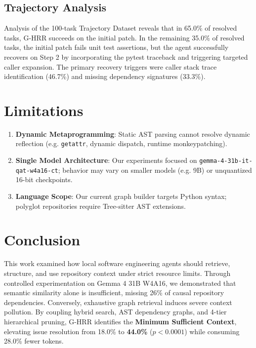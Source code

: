 \documentclass[10pt,twocolumn,letterpaper]{article}
\begin{document}
\subsection{Trajectory Analysis}
Analysis of the 100-task Trajectory Dataset reveals that in 65.0\% of resolved tasks, G-HRR succeeds on the initial patch. In the remaining 35.0\% of resolved tasks, the initial patch fails unit test assertions, but the agent successfully recovers on Step 2 by incorporating the pytest traceback and triggering targeted caller expansion. The primary recovery triggers were caller stack trace identification (46.7\%) and missing dependency signatures (33.3\%).

\section{Limitations}
\begin{enumerate}
    \item \textbf{Dynamic Metaprogramming}: Static AST parsing cannot resolve dynamic reflection (e.g. \texttt{getattr}, dynamic dispatch, runtime monkeypatching).
    \item \textbf{Single Model Architecture}: Our experiments focused on \texttt{gemma-4-31b-it-qat-w4a16-ct}; behavior may vary on smaller models (e.g. 9B) or unquantized 16-bit checkpoints.
    \item \textbf{Language Scope}: Our current graph builder targets Python syntax; polyglot repositories require Tree-sitter AST extensions.
\end{enumerate}

\section{Conclusion}
This work examined how local software engineering agents should retrieve, structure, and use repository context under strict resource limits. Through controlled experimentation on Gemma 4 31B W4A16, we demonstrated that semantic similarity alone is insufficient, missing 26\% of causal repository dependencies. Conversely, exhaustive graph retrieval induces severe context pollution. By coupling hybrid search, AST dependency graphs, and 4-tier hierarchical pruning, G-HRR identifies the \textbf{Minimum Sufficient Context}, elevating issue resolution from 18.0\% to \textbf{44.0\%} ($p < 0.0001$) while consuming 28.0\% fewer tokens.



\end{document}

